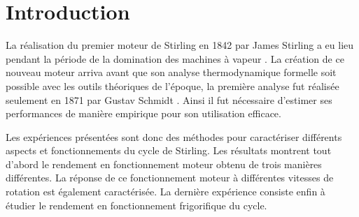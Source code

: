 \section{Introduction}
La réalisation du premier moteur de Stirling en 1842 par James Stirling a eu lieu pendant la période de la domination des machines à vapeur \cite{histoire-stir}. La création de ce nouveau moteur arriva avant que son analyse thermodynamique formelle soit possible avec les outils théoriques de l'époque, la première analyse fut réalisée seulement en 1871 par Gustav Schmidt \cite{histoire-schmidt}. Ainsi il fut nécessaire d'estimer ses performances de manière empirique pour son utilisation efficace.

Les expériences présentées sont donc des méthodes pour caractériser différents aspects et fonctionnements du cycle de Stirling. Les résultats montrent tout d'abord le rendement en fonctionnement moteur obtenu de trois manières différentes. La réponse de ce fonctionnement moteur à différentes vitesses de rotation est également caractérisée. La dernière expérience consiste enfin à étudier le rendement en fonctionnement frigorifique du cycle.